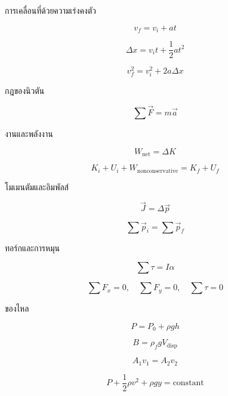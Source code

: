 \begin{tcolorbox}[title=สูตรหลักที่ใช้บ่อยในข้อสอบรวม]
การเคลื่อนที่ด้วยความเร่งคงตัว

\[
v_f=v_i+at
\]

\[
\Delta x=v_it+\frac{1}{2}at^2
\]

\[
v_f^2=v_i^2+2a\Delta x
\]

กฎของนิวตัน

\[
\sum \vec{F}=m\vec{a}
\]

งานและพลังงาน

\[
W_{\text{net}}=\Delta K
\]

\[
K_i+U_i+W_{\text{nonconservative}}=K_f+U_f
\]

โมเมนตัมและอิมพัลส์

\[
\vec{J}=\Delta \vec{p}
\]

\[
\sum \vec{p}_i=\sum \vec{p}_f
\]

ทอร์กและการหมุน

\[
\sum \tau=I\alpha
\]

\[
\sum F_x=0,\quad \sum F_y=0,\quad \sum \tau=0
\]

ของไหล

\[
P=P_0+\rho gh
\]

\[
B=\rho_fgV_{\text{disp}}
\]

\[
A_1v_1=A_2v_2
\]

\[
P+\frac{1}{2}\rho v^2+\rho gy=\text{constant}
\]
\end{tcolorbox}